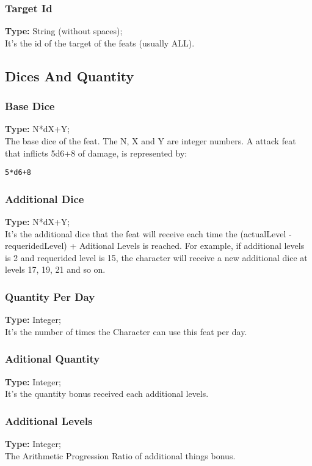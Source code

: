 \documentclass[letterpaper,12pt]{article}
\begin{document}
\subsubsection{Target Id}
{\bf Type:} String (without spaces);\\
It's the id of the target of the feats (usually ALL).

\subsection{Dices And Quantity}

\subsubsection{Base Dice}
{\bf Type:} N*dX+Y;\\
The base dice of the feat. The N, X and Y are integer numbers. A attack feat
that inflicts 5d6+8 of damage, is represented by:

\begin{verbatim}
5*d6+8
\end{verbatim}

\subsubsection{Additional Dice}
{\bf Type:} N*dX+Y;\\ 
It's the additional dice that the feat will receive each
time the (actualLevel - requeridedLevel) + Aditional Levels is reached. For
example, if additional levels is 2 and requerided level is 15, the character
will receive a new additional dice at levels 17, 19, 21 and so on. 

\subsubsection{Quantity Per Day}
{\bf Type:} Integer;\\
It's the number of times the Character can use this feat per day.

\subsubsection{Aditional Quantity}
{\bf Type:} Integer;\\
It's the quantity bonus received each additional levels. 

\subsubsection{Additional Levels}
{\bf Type:} Integer;\\
The Arithmetic Progression Ratio of additional things bonus.
\end{document}
